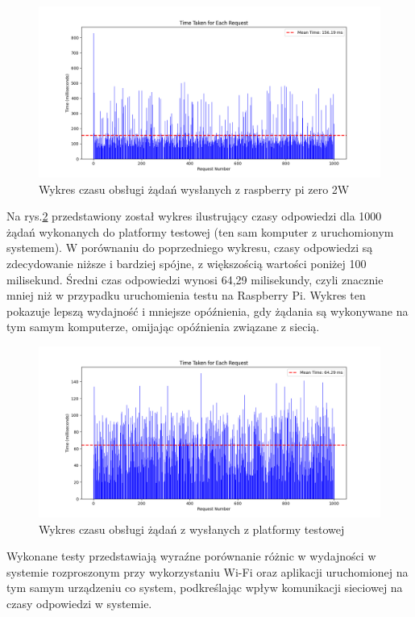 \begin{figure}
    \centering
    \includegraphics[width=\textwidth]{images/testy/tests.png}
    \caption{Wykres czasu obsługi żądań wysłanych z raspberry pi zero 2W}
    \label{testraspberryPiGraph}
\end{figure}

 Na rys.\ref{testlocalhostGraph} przedstawiony został wykres ilustrujący czasy odpowiedzi dla 1000 żądań wykonanych do platformy testowej (ten sam komputer z uruchomionym systemem). W porównaniu do poprzedniego wykresu, czasy odpowiedzi są zdecydowanie niższe i bardziej spójne, z większością wartości poniżej 100 milisekund. Średni czas odpowiedzi wynosi 64,29 milisekundy, czyli znacznie mniej niż w przypadku uruchomienia testu na Raspberry Pi. Wykres ten pokazuje lepszą wydajność i mniejsze opóźnienia, gdy żądania są wykonywane na tym samym komputerze, omijając opóźnienia związane z siecią.


\begin{figure}[!htbp]
    \centering
    \includegraphics[width=\textwidth]{images/testy/testsLocalhost.png}
    \caption{Wykres czasu obsługi żądań z wysłanych z platformy testowej}
    \label{testlocalhostGraph}
\end{figure}

Wykonane testy przedstawiają wyraźne porównanie różnic w wydajności w systemie rozproszonym przy wykorzystaniu Wi-Fi oraz aplikacji uruchomionej na tym samym urządzeniu co system, podkreślając wpływ komunikacji sieciowej na czasy odpowiedzi w systemie.

